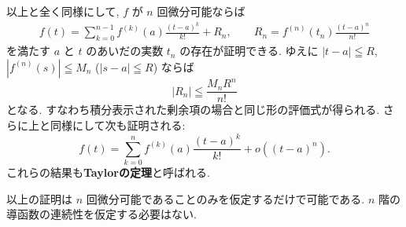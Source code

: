 \documentclass[12pt,twoside]{jarticle}
\theoremstyle{jplain}
\theoremstyle{jplain}
\theoremstyle{jplain}
\numberwithin{theorem}{section}
\numberwithin{equation}{section}
\numberwithin{figure}{section}
\numberwithin{table}{section}
\begin{document}
以上と全く同様にして, $f$ が $n$ 回微分可能ならば
\begin{align*}
f(t)=
\sum_{k=0}^{n-1} f^{(k)}(a)\frac{(t-a)^k}{k!}
+R_n,
\qquad
R_n = f^{(n)}(t_n)\frac{(t-a)^n}{n!}
\end{align*}
を満たす $a$ と $t$ のあいだの実数 $t_n$ の存在が証明できる.
ゆえに $|t-a|\leqq R$, $|f^{(n)}(s)|\leqq M_n$ ($|s-a|\leqq R$) ならば
\[
|R_n| \leqq \frac{M_n R^n}{n!} 
\]
となる. すなわち積分表示された剰余項の場合と同じ形の評価式が得られる.
さらに上と同様にして次も証明される:
\[
f(t) = \sum_{k=0}^n f^{(k)}(a)\frac{(t-a)^k}{k!} + o((t-a)^n).
\]
これらの結果も{\bf Taylorの定理}と呼ばれる.

以上の証明は $n$ 回微分可能であることのみを仮定するだけで可能である.
$n$ 階の導函数の連続性を仮定する必要はない.

\end{document}
